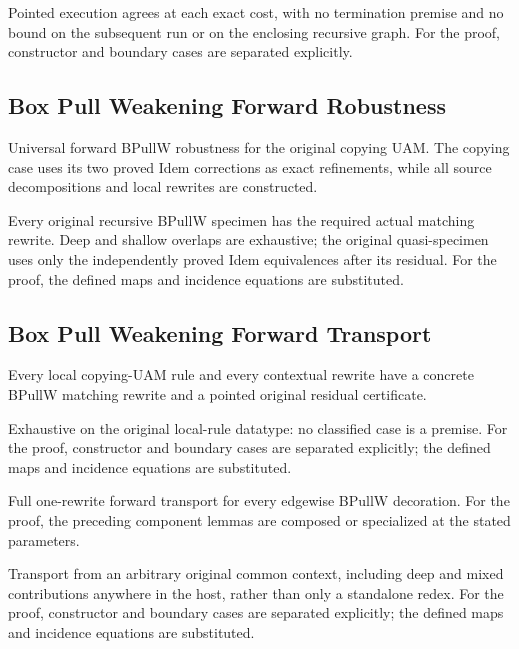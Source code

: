 Pointed execution agrees at each exact cost, with no termination premise and no bound on the subsequent run or on the enclosing recursive graph.
For the proof, constructor and boundary cases are separated explicitly.
\par{}

\subsection{Box Pull Weakening Forward Robustness}
Universal forward BPullW robustness for the original copying UAM. The copying case uses its two proved Idem corrections as exact refinements, while all source decompositions and local rewrites are constructed.

Every original recursive BPullW specimen has the required actual matching rewrite. Deep and shallow overlaps are exhaustive; the original quasi-specimen uses only the independently proved Idem equivalences after its residual.
For the proof, the defined maps and incidence equations are substituted.
\par{}

\subsection{Box Pull Weakening Forward Transport}
Every local copying-UAM rule and every contextual rewrite have a concrete BPullW matching rewrite and a pointed original residual certificate.

Exhaustive on the original local-rule datatype: no classified case is a premise.
For the proof, constructor and boundary cases are separated explicitly; the defined maps and incidence equations are substituted.
\par{}

Full one-rewrite forward transport for every edgewise BPullW decoration.
For the proof, the preceding component lemmas are composed or specialized at the stated parameters.
\par{}

Transport from an arbitrary original common context, including deep and mixed contributions anywhere in the host, rather than only a standalone redex.
For the proof, constructor and boundary cases are separated explicitly; the defined maps and incidence equations are substituted.
\par{}


